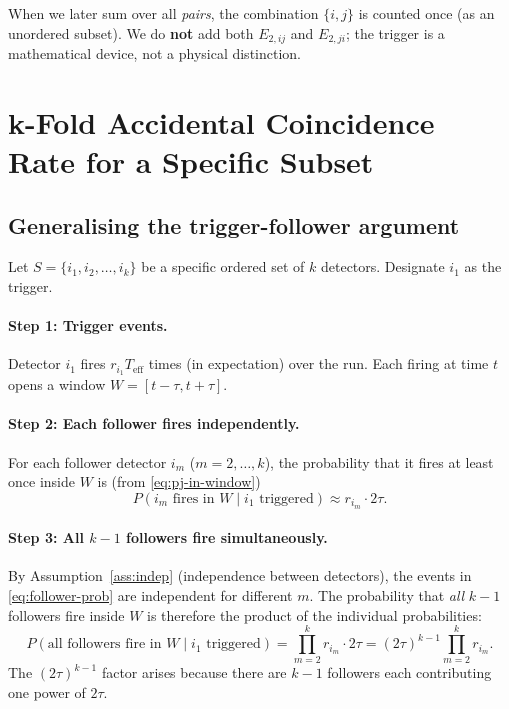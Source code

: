 \documentclass[12pt]{article}
\theoremstyle{definition}
\newcommand{\Teff}{T_{\!\text{eff}}}
\newcommand{\Prob}[1]{P\!\left(#1\right)}
\begin{document}
When we later sum over all \emph{pairs}, the combination $\{i,j\}$ is
counted once (as an unordered subset).  We do \textbf{not} add both
$E_{2,ij}$ and $E_{2,ji}$; the trigger is a mathematical device, not a
physical distinction.

\section{k-Fold Accidental Coincidence Rate for a Specific Subset}
\label{sec:kfold-specific}

\subsection{Generalising the trigger-follower argument}

Let $S = \{i_1, i_2, \ldots, i_k\}$ be a specific ordered set of $k$
detectors.  Designate $i_1$ as the trigger.

\paragraph{Step 1: Trigger events.}
Detector $i_1$ fires $r_{i_1}\Teff$ times (in expectation) over the run.
Each firing at time $t$ opens a window $W = [t-\tau, t+\tau]$.

\paragraph{Step 2: Each follower fires independently.}
For each follower detector $i_m$ ($m = 2, \ldots, k$), the probability
that it fires at least once inside $W$ is (from \eqref{eq:pj-in-window})
\begin{equation}
    \Prob{i_m \text{ fires in } W \mid i_1 \text{ triggered}}
    \approx r_{i_m}\cdot 2\tau.
    \label{eq:follower-prob}
\end{equation}

\paragraph{Step 3: All $k-1$ followers fire simultaneously.}
By Assumption~\ref{ass:indep} (independence between detectors), the
events in \eqref{eq:follower-prob} are independent for different $m$.
The probability that \textit{all} $k-1$ followers fire inside $W$ is
therefore the product of the individual probabilities:
\begin{equation}
    \Prob{\text{all followers fire in }W \mid i_1 \text{ triggered}}
    = \prod_{m=2}^{k} r_{i_m}\cdot 2\tau
    = (2\tau)^{k-1}\prod_{m=2}^{k} r_{i_m}.
    \label{eq:all-followers}
\end{equation}
The $(2\tau)^{k-1}$ factor arises because there are $k-1$ followers each
contributing one power of $2\tau$.
\end{document}
